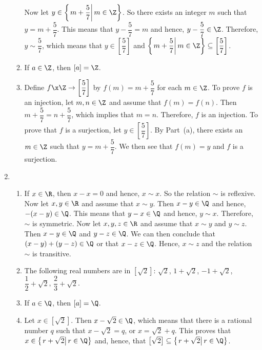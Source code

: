 \begin{enumerate}
\begin{enumerate}
Now let $y \in \left\{ \left. m + \dfrac{5}{7} \right| m \in \Z \right\}$.  So there exists an integer $m$ such that $y = m + \dfrac{5}{7}$.  This means that $y - \dfrac{5}{7} = m$ and hence, $y - \dfrac{5}{7} \in \Z$.  Therefore, $y \sim \dfrac{5}{7}$, which means that $y \in \left[ \dfrac{5}{7} \right]$ and 
$\left\{ \left. m + \dfrac{5}{7} \right| m \in \Z \right\} \subseteq \left[ \dfrac{5}{7} \right]$.

\item If $a \in \Z$, then $[a] = \Z$.

\item Define $f\x \Z \to \left[ \dfrac{5}{7} \right]$ by $f(m) = m + \dfrac{5}{7}$ for each $m \in \Z$.  To prove $f$ is an injection, let $m, n \in \Z$ and assume that 
$f(m) = f(n)$.  Then $m + \dfrac{5}{7} = n + \dfrac{5}{7}$, which implies that $m = n$.  Therefore, $f$ is an injection.  To prove that $f$ is a surjection, let 
$y \in  \left[ \dfrac{5}{7} \right]$.  By Part~(a), there exists an $m \in \Z$ such that 
$y = m + \dfrac{5}{7}$.  We then see that $f(m) = y$ and $f$ is a surjection.
\end{enumerate}


\item \begin{enumerate}
\item If $x \in \R$, then $x - x = 0$ and hence, $x \sim x$.  So the relation $\sim$ is reflexive.  Now let $x, y \in \R$ and assume that $x \sim y$.  Then $x - y \in \Q$ and hence, $-(x - y) \in \Q$.  This means that $y - x \in \Q$ and hence, $y \sim x$.  Therefore, $\sim$ is symmetric.  Now let $x, y, z \in \R$ and assume that $x \sim y$ and 
$y \sim z$.  Then $x - y \in \Q$ and $y - z \in \Q$.  We can then conclude that 
$(x - y) + (y - z) \in \Q$ or that $x - z \in \Q$.  Hence, $x \sim z$ and the relation 
$\sim$ is transitive.

\item The following real numbers are in $\left[ \sqrt{2} \right]$:  $\sqrt{2}$, 
$1 + \sqrt{2}$, $-1 + \sqrt{2}$, $\dfrac{1}{2} + \sqrt{2}$, $\dfrac{2}{3} + \sqrt{2}$.

\item If $a \in \Q$, then $[a] = \Q$.

\item Let $x \in \left[ \sqrt{2} \right]$.  Then $x - \sqrt{2} \in \Q$, which means that there is a rational number $q$  such that $x - \sqrt{2} = q$, or $x = \sqrt{2} + q$.  This proves that $x \in \left\{ \left. r + \sqrt{2} \right| r \in \Q \right\}$ and, hence, that
$\left[ \sqrt{2} \right] \subseteq \left\{ \left. r + \sqrt{2} \right| r \in \Q \right\}$.


\end{enumerate}
\end{enumerate}
